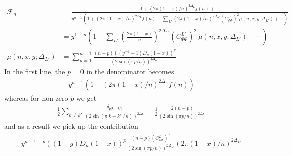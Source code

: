 \documentclass[11pt]{article}
\newcommand{\nn}{\nonumber}
\newcommand{\lb}{\left(}
\newcommand{\rb}{\right)}
\newcommand{\JM}[1]{\textcolor{orange}{#1}}
\begin{document}
\begin{align}
\mathcal{F}_n
    &=\frac{\,1+(2\pi (1-x)/n)^{2\Delta_L}f(n)+\cdots\,}{\displaystyle y^{n-1}\lb 1+(2\pi (1-x)/n)^{2\Delta_L} f(n)+\sum_{L'}\lb 2\pi (1-x)/n\rb ^{2\Delta_{L'}} {(C_{\Psi\Phi}^{L'})}^2\mu(n,x,y;\Delta_{L'})+\cdots\rb}\nn\\
&=y^{1-n}\lb 1-\sum_{L'}\lb\frac{2\pi (1-x)}{n}\rb^{2\Delta_{L'}}  {(C_{\Psi\Phi}^{L'})}^2 \:\mu(n,x,y;\Delta_{L'})+\cdots \rb\nn\\
\mu(n,x,y;\Delta_{L'})&=\sum_{p=1}^{n-1}\frac{(n-p)((y^{-1}-1)D_n(1-x))^p}{(2\sin(\pi p/n))^{2\Delta_{L'}}} \label{eq: mu (n,x,DeltaL')}
\end{align}
In the first line, the $p=0$ in the denominator becomes
\begin{align}
y^{n-1} (1+(2\pi (1-x)/n)^{2\Delta_L}f(n))
\end{align}
whereas for non-zero $p$ we get
\begin{align}
  \frac{1}{2}\sum_{k\neq k'}\frac{\delta_{p|k-k'|}}{(2\sin(\pi|k-k'|/n))^{2\Delta_{L'}}}=\frac{1}{2}\frac{2(n-p)}{(2\sin(\pi p/n))^{2\Delta_{L'}}}
\end{align}
and as a result we pick up the contribution
\begin{align}
  y^{n-1-p}((1-y) D_n(1-x))^p \frac{(n-p) {(C_{\Psi\Phi}^{L'})}^2}{(2\sin(\pi p/n))^{2\Delta_{L'}}}(2\pi (1-x)/n)^{2\Delta_{L'}}
\end{align}
\end{document}
